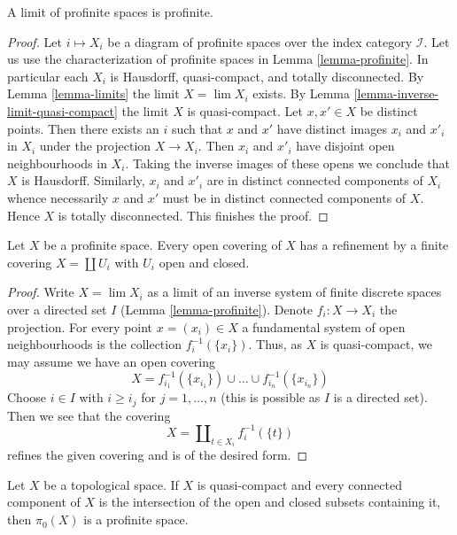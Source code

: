 \begin{lemma}
\label{lemma-directed-inverse-limit-profinite}
A limit of profinite spaces is profinite.
\end{lemma}

\begin{proof}
Let $i \mapsto X_i$ be a diagram of profinite spaces
over the index category $\mathcal{I}$.
Let us use the characterization of profinite spaces in
Lemma \ref{lemma-profinite}. In particular each $X_i$ is
Hausdorff, quasi-compact, and totally disconnected.
By Lemma \ref{lemma-limits} the limit $X = \lim X_i$ exists.
By Lemma \ref{lemma-inverse-limit-quasi-compact}
the limit $X$ is quasi-compact. Let $x, x' \in X$ be distinct points.
Then there exists an $i$ such that $x$ and $x'$
have distinct images $x_i$ and $x'_i$ in $X_i$
under the projection $X \to X_i$. Then $x_i$ and $x'_i$
have disjoint open neighbourhoods in $X_i$. Taking the
inverse images of these opens we conclude that $X$ is Hausdorff.
Similarly, $x_i$ and $x'_i$ are in distinct connected components
of $X_i$ whence necessarily $x$ and $x'$ must be in distinct
connected components of $X$. Hence $X$ is totally disconnected.
This finishes the proof.
\end{proof}

\begin{lemma}
\label{lemma-profinite-refine-open-covering}
Let $X$ be a profinite space. Every open covering of $X$ has a refinement
by a finite covering $X = \coprod U_i$ with $U_i$ open and closed.
\end{lemma}

\begin{proof}
Write $X = \lim X_i$ as a limit of an inverse system of finite discrete
spaces over a directed set $I$ (Lemma \ref{lemma-profinite}).
Denote $f_i : X \to X_i$ the projection.
For every point $x = (x_i) \in X$ a fundamental system of open neighbourhoods
is the collection $f_i^{-1}(\{x_i\})$. Thus, as $X$ is quasi-compact, we may
assume we have an open covering
$$
X = f_{i_1}^{-1}(\{x_{i_1}\}) \cup \ldots \cup f_{i_n}^{-1}(\{x_{i_n}\})
$$
Choose $i \in I$ with $i \geq i_j$ for $j = 1, \ldots, n$ (this is possible
as $I$ is a directed set). Then we see
that the covering
$$
X = \coprod\nolimits_{t \in X_i} f_i^{-1}(\{t\})
$$
refines the given covering and is of the desired form.
\end{proof}

\begin{lemma}
\label{lemma-pi0-profinite}
Let $X$ be a topological space. If $X$ is quasi-compact
and every connected component of $X$ is the intersection
of the open and closed subsets containing it, then $\pi_0(X)$
is a profinite space.
\end{lemma}


